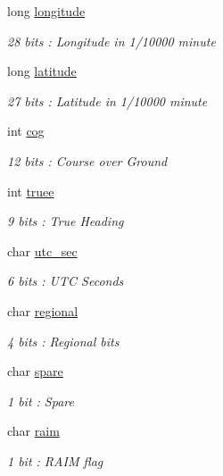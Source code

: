 \begin{DoxyCompactItemize}
long \mbox{\hyperlink{structaismsg__2_a04b85fb57d702e8bd501e1048681568f}{longitude}}
\begin{DoxyCompactList}\small\item\em 28 bits \+: Longitude in 1/10000 minute \end{DoxyCompactList}\item 
long \mbox{\hyperlink{structaismsg__2_ab3d9d1e6326b92c11bcc22cc710797d8}{latitude}}
\begin{DoxyCompactList}\small\item\em 27 bits \+: Latitude in 1/10000 minute \end{DoxyCompactList}\item 
int \mbox{\hyperlink{structaismsg__2_a9f41728f55cd8b7f3c8c811b149297ff}{cog}}
\begin{DoxyCompactList}\small\item\em 12 bits \+: Course over Ground \end{DoxyCompactList}\item 
int \mbox{\hyperlink{structaismsg__2_ac3b0a063d1c12347d202bc2a398e4a3f}{truee}}
\begin{DoxyCompactList}\small\item\em 9 bits \+: True Heading \end{DoxyCompactList}\item 
char \mbox{\hyperlink{structaismsg__2_aaedf95571f256b1f7cd697319fcbf2ed}{utc\+\_\+sec}}
\begin{DoxyCompactList}\small\item\em 6 bits \+: U\+TC Seconds \end{DoxyCompactList}\item 
char \mbox{\hyperlink{structaismsg__2_add64754330391b21fb284355cd6d5de4}{regional}}
\begin{DoxyCompactList}\small\item\em 4 bits \+: Regional bits \end{DoxyCompactList}\item 
char \mbox{\hyperlink{structaismsg__2_af5d3d5ed05bef69384115ac74e03ae2b}{spare}}
\begin{DoxyCompactList}\small\item\em 1 bit \+: Spare \end{DoxyCompactList}\item 
char \mbox{\hyperlink{structaismsg__2_abe0ad6fa8de23d9414c6a660dc4eb3c5}{raim}}
\begin{DoxyCompactList}\small\item\em 1 bit \+: R\+A\+IM flag \end{DoxyCompactList}\item 

\end{DoxyCompactItemize}
